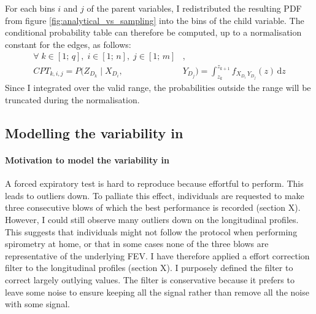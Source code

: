 For each bins $i$ and $j$ of the parent variables, I redistributed the resulting PDF from figure \ref{fig:analytical_vs_sampling} into the bins of the child variable. The conditional probability table can therefore be computed, up to a normalisation constant for the edges, as follows:
\begin{align*}
\forall\; k\!\in\![1;\,\!q],\;i\!\in\![1;\,\!n],\; j\!\in\![1;\,m]&,\\
CPT_{k,i,j} = P\bigl(Z_{D_{k}}\mid X_{D_i}, &Y_{D_j}\bigr)
=
\int_{z_k}^{z_{k+1}}
   f_{X_{D_i}\, Y_{D_j}}(z)\,\mathrm{d}z
\end{align*}
Since I integrated over the valid range, the probabilities outside the range will be truncated during the normalisation.
 
\subsection{Modelling the variability in \F}

\paragraph{Motivation to model the variability in \F}
A forced expiratory test is hard to reproduce because effortful to perform. This leads to outliers down. To palliate this effect, individuals are requested to make three consecutive blows of which the best performance is recorded (section X). However,  I could still observe many outliers down on the longitudinal profiles. This suggests that individuals might not follow the protocol when performing spirometry at home, or that in some cases none of the three blows are representative of the underlying FEV. I have therefore applied a effort correction filter to the longitudinal profiles (section X). I purposely defined the filter to correct largely outlying values. The filter is conservative because it prefers to leave some noise to ensure keeping all the signal rather than remove all the noise with some signal. 

